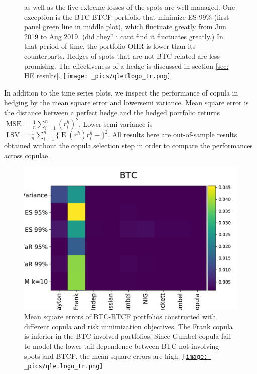 \begin{figure}[ht]
{            as well as the five extreme losses of the spots are well managed.
            One exception is the BTC-BTCF portfolio that minimize ES 99\% (first panel green line in middle plot), which fluctuate greatly from Jun 2019 to Aug 2019.   \textcolor{plt4}{(did they? i cant find it fluctuates greatly.)}            In that period of time, the portfolio OHR is lower than its counterparts.
            Hedges of spots that are not BTC related are less promising.
            The effectiveness of a hedge is discussed in section \ref{sec: HE results}.
  \href{http://www.quantlet.com/}{\texttt{[image: \_pics/qletlogo\_tr.png]}} }
\label{fig:overview}
\end{figure}

In addition to the time series plots,
we inspect the performance of copula in hedging by the mean square error and lowersemi variance.
Mean square error is the distance between a perfect hedge and the hedged portfolio returns $\operatorname{MSE}=\frac{1}{n}\sum_{i=1}^n(r^h_i)^2$.
Lower semi variance is $\operatorname{LSV}=\frac{1}{n}\sum_{i=1}^n\{\operatorname{E}(r^h)r^h_i-\}^2$.
All results here are out-of-sample results obtained without the copula selection step in order to compare the performances across copulae.  \medskip

\begin{figure}[ht]
    \centering
    \includegraphics[width=\textwidth]{_pics/MSE_BTC.pdf}
  \caption{Mean square errors of BTC-BTCF portfolios constructed with different copula and risk minimization objectives.
    The Frank copula is inferior in the BTC-involved portfolios.
    Since Gumbel copula fail to model the lower tail dependence between BTC-not-involving spots and BTCF, the mean square errors are high.
  \href{http://www.quantlet.com/}{\texttt{[image: \_pics/qletlogo\_tr.png]}} }
\label{fig:MSE_BTC}
\end{figure}

